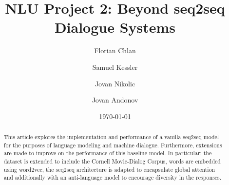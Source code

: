 \documentclass[%
 reprint,
 amsmath,amssymb,
 aps,
]{revtex4-1}
\begin{document}

\title{NLU Project 2: Beyond seq2seq Dialogue Systems}%

\author{Florian Chlan}
\author{Samuel Kessler}
\author{Jovan Nikolic}
 \author{Jovan Andonov}
%




\date{\today}%

\begin{abstract}
This article explores the implementation and performance of a vanilla seq2seq model for the purposes of language modeling and machine dialogue. Furthermore, extensions are made to improve on the performance of this baseline model. In particular: the dataset is extended to include the Cornell Movie-Dialog Corpus, words are embedded using word2vec, the seq2seq architecture is adapted to encapsulate global attention and additionally with an anti-language model to encourage diversity in the responses.


\end{abstract}
\end{document}
